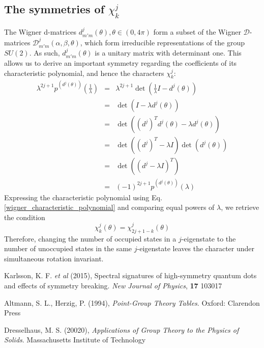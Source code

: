 \documentclass[12pt]{article}
\begin{document}
	\subsection{The symmetries of $\chi^j_k$}
	The Wigner d-matrices $d^j_{m'm}(\theta), \theta\in (0,4\pi)$ form a subset of the Wigner $\mathcal{D}$-matrices $\mathcal{D}^j_{m'm}(\alpha, \beta, \theta)$, which form irreducible representations of the group $SU(2)$. As such, $d^j_{m'm}(\theta)$ is a unitary matrix with determinant one. This allows us to derive an important symmetry regarding the coefficients of its characteristic polynomial, and hence the characters $\chi^j_k$:
	\begin{eqnarray}
	\lambda^{2j+1}p^{\left(d^j(\theta)\right)}\left(\frac{1}{\lambda}\right) &=& \lambda^{2j+1}\det(\frac{1}{\lambda}I-d^j(\theta))\\
	&=& \det(I-\lambda d^j(\theta))\\
	&=& \det(\left(d^j\right)^Td^j(\theta)-\lambda d^j(\theta))\\
	&=& \det(\left(d^j\right)^T-\lambda I)\det(d^j(\theta))\\
	&=& \det(\left(d^j-\lambda I\right)^T)\\
	&=& (-1)^{2j+1}p^{\left(d^j(\theta)\right)}(\lambda)
	\end{eqnarray}
	Expressing the characteristic polynomial using Eq. \ref{wigner_characteristic_polynomial} and comparing equal powers of $\lambda$, we retrieve the condition
	\begin{equation}
	\chi^j_k(\theta)=\chi^j_{2j+1-k}(\theta)
	\end{equation}
	Therefore, changing the number of occupied states in a $j$-eigenstate to the number of unoccupied states in the same $j$-eigenstate leaves the character under simultaneous rotation invariant.
	
	\begin{thebibliography}{10}

Karlsson, K. F. \textit{et al} (2015), Spectral signatures of high-symmetry quantum dots and effects of symmetry breaking. \textit{New Journal of Physics}, \textbf{17} 103017

Altmann, S. L., Herzig, P. (1994), \textit{Point-Group Theory Tables}. Oxford: Clarendon Press

Dresselhaus, M. S. (20020), \textit{Applications of Group Theory to the Physics of Solids}. Massachusetts Institute of Technology


\end{thebibliography}	
	
\end{document}
